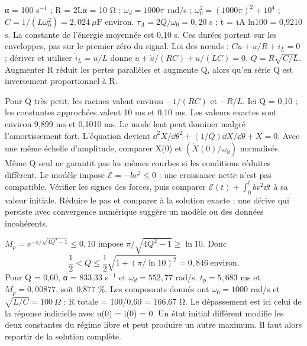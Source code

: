 α = 100 s$^{-1}$ ; R = 2Lα = 10 Ω ; $\omega_d=1000\pi$ rad/s ; $\omega_0^2=(1000\pi)^2+10^4$ ; $C=1/(L\omega_0^2)=2{,}024\ \mu\mathrm{ F}$ environ.
$\tau_A=2Q/\omega_0=0{,}20$ s ; t = τA ln100 = 0,9210 s. La constante de l’énergie moyennée est 0,10 s. Ces durées portent sur les enveloppes, pas sur le premier zéro du signal.
Loi des nœuds : $C\dot u+u/R+i_L=0$ ; dériver et utiliser $\dot i_L=u/L$ donne $\ddot u+\dot u/(RC)+u/(LC)=0$. $Q=R\sqrt{C/L}$. Augmenter R réduit les pertes parallèles et augmente Q, alors qu’en série Q est inversement proportionnel à R.


Pour Q très petit, les racines valent environ $-1/(RC)$ et $-R/L$. Ici Q = 0,10 ; les constantes approchées valent 10 ms et 0,10 ms. Les valeurs exactes sont environ 9,899 ms et 0,1010 ms. Le mode lent peut dominer malgré l’amortissement fort.
L’équation devient $\dd^2X/\dd\theta^2+(1/Q)\dd X/\dd\theta+X=0$. Avec une même échelle d’amplitude, comparer X(0) et $(\dot X(0)/\omega_0)$ normalisés. Même Q seul ne garantit pas les mêmes courbes si les conditions réduites diffèrent.
Le modèle impose $\dot{\mathcal E}=-bv^2\leq0$ : une croissance nette n’est pas compatible. Vérifier les signes des forces, puis comparer $\mathcal E(t)+\int_0^t bv^2\dd t$ à sa valeur initiale. Réduire le pas et comparer à la solution exacte ; une dérive qui persiste avec convergence numérique suggère un modèle ou des données incohérents.


$M_p=e^{-\pi/\sqrt{4Q^2-1}}\leq0{,}10$ impose $\pi/\sqrt{4Q^2-1}\geq\ln10$. Donc
\[\frac12<Q\leq\frac12\sqrt{1+(\pi/\ln10)^2}=0{,}846\ \text{environ}.\]
Pour Q = 0,60, α = 833,33 s$^{-1}$ et $\omega_d=552{,}77$ rad/s. $t_p=5{,}683$ ms et $M_p=0{,}00877$, soit 0,877 \%. Les composants donnés ont $\omega_0=1000$ rad/s et $\sqrt{L/C}=100\ \Omega$ : R totale = 100/0,60 = 166,67 Ω.
Le dépassement est ici celui de la réponse indicielle avec u(0) = i(0) = 0. Un état initial différent modifie les deux constantes du régime libre et peut produire un autre maximum. Il faut alors repartir de la solution complète.


